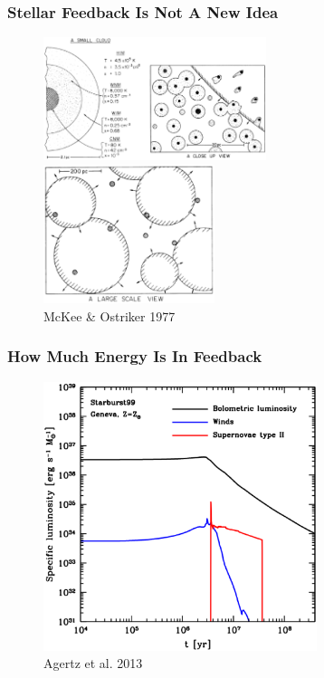 \documentclass[serif,mathserif]{beamer}
\begin{document}
\begin{frame}
	\frametitle{Stellar Feedback Is Not A New Idea}
	\begin{figure}[t]
	\centering
	\includegraphics[width=6.5cm]{figures/mckee_ostriker1}
	\includegraphics[width=5cm]{figures/mckee_ostriker2}\\
	\tiny{McKee \& Ostriker 1977}
	\end{figure}
\end{frame}

\begin{frame}
	\frametitle{How Much Energy Is In Feedback}
	\begin{figure}[t]
	\centering
	\includegraphics[width=8cm]{figures/SB99_luminosity}\\
	\tiny{Agertz et al. 2013}
	\end{figure}
\end{frame}
\end{document}
